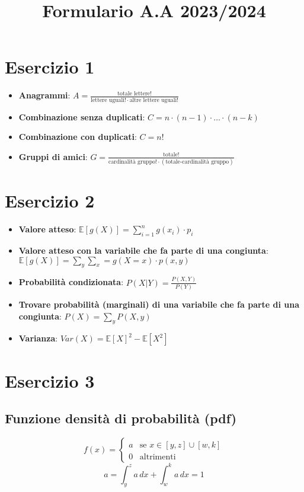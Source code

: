 \documentclass[12pt]{article}
\title{Formulario A.A 2023/2024}
\author{}
\begin{document}
\maketitle
\section{Esercizio 1}
\begin{itemize}
    \item \textbf{Anagrammi}: $A = \frac{\text{totale lettere}!}{\text{lettere uguali}!\cdot\text{altre lettere uguali}!}$
    \item \textbf{Combinazione senza duplicati}: $C = n\cdot (n-1)\cdot\ldots\cdot(n-k)$
    \item \textbf{Combinazione con duplicati}: $C = n!$
    \item \textbf{Gruppi di amici}: $G = \frac{\text{totale}!}{\text{cardinalità gruppo}!\cdot(\text{totale-cardinalità gruppo})}$
\end{itemize}
\section{Esercizio 2}
\begin{itemize}
    \item \textbf{Valore atteso}: $\mathbb{E}[g(X)] = \sum_{i=1}^{n}g(x_i)\cdot p_i$
    \item \textbf{Valore atteso con la variabile che fa parte di una congiunta}: $\mathbb{E}[g(X)] = \sum_{y}\sum_{x}=g(X=x)\cdot p(x,y)$
    \item \textbf{Probabilità condizionata}: $P(X|Y) = \frac{P(X,Y)}{P(Y)}$
    \item \textbf{Trovare probabilità (marginali) di una variabile che fa parte di una congiunta}: $P(X) = \sum_{y}P(X,y)$
    \item \textbf{Varianza}: $Var(X)=\mathbb{E}[X]^{2}-\mathbb{E}[X^{2}]$
\end{itemize}
\section{Esercizio 3}
\subsection{Funzione densità di probabilità (pdf)}
\begin{equation*}
    f(x) = \begin{cases}
        a & \text{se } x \in [y,z]\cup[w,k]\\
        0 & \text{altrimenti}
    \end{cases}
\end{equation*}
\begin{equation*}
    a = \int_{y}^{z}a \,dx + \int_{w}^{k}a \,dx = 1
\end{equation*}
\end{document}

